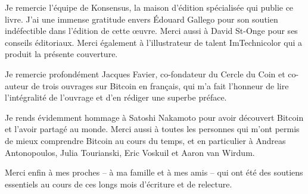 Je remercie l'équipe de Konsensus, la maison d'édition spécialisée qui publie ce livre. J'ai une immense gratitude envers Édouard Gallego pour son soutien indéfectible dans l'édition de cette œuvre. Merci aussi à David St-Onge pour ses conseils éditoriaux. Merci également à l'illustrateur de talent ImTechnicolor qui a produit la présente couverture.

Je remercie profondément Jacques Favier, co-fondateur du Cercle du Coin et co-auteur de trois ouvrages sur Bitcoin en français, qui m'a fait l'honneur de lire l'intégralité de l'ouvrage et d'en rédiger une superbe préface.

Je rends évidemment hommage à Satoshi Nakamoto pour avoir découvert Bitcoin et l'avoir partagé au monde. Merci aussi à toutes les personnes qui m'ont permis de mieux comprendre Bitcoin au cours du temps, et en particulier à Andreas Antonopoulos, Julia Tourianski, Eric Voskuil et Aaron van Wirdum.

Merci enfin à mes proches -- à ma famille et à mes amis -- qui ont été des soutiens essentiels au cours de ces longs mois d'écriture et de relecture.